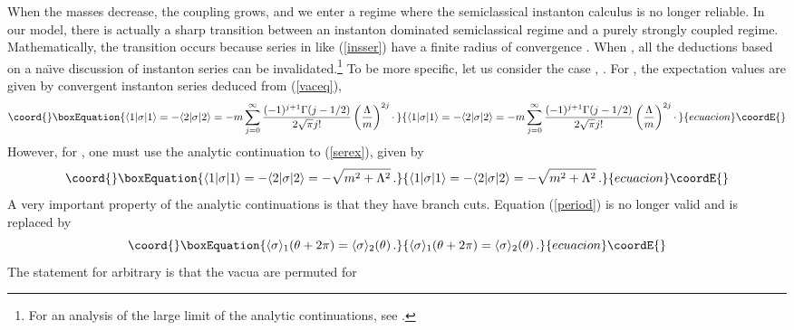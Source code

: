 \documentclass[a4paper,12pt]{article}
\begin{document}
When the masses \coordHE{} decrease, the coupling grows, and we 
enter a regime where the semiclassical instanton calculus 
is no longer reliable. In our model, there is actually a sharp 
transition between an instanton dominated semiclassical regime and 
a purely strongly coupled regime. Mathematically, the transition 
occurs because series in \coordHE{} like (\ref{insser}) have a finite
radius of convergence \coordHE{}. When \coordHE{},
all the deductions based on a na\"\i ve discussion of instanton series 
can be invalidated.\footnote{For an 
analysis of the large \coordHE{} limit of the analytic continuations, see 
\cite{fer1,fer2D}.} 
To be more specific, let us consider the case \coordHE{}, 
\coordHE{}.
For \coordHE{}, the expectation values are given by convergent
instanton series deduced from (\ref{vaceq}),
%
\begin{equation}\coord{}\boxEquation{
\label{serex}
\langle 1|\sigma |1\rangle = -\langle 2|\sigma |2\rangle = -m 
\sum_{j=0}^{\infty} {(-1)^{j+1}\Gamma(j-1/2)\over 2\sqrt{\pi} j!} 
\left( {\Lambda\over m}\right)^{2j}\cdotp
}{
\langle 1|\sigma |1\rangle = -\langle 2|\sigma |2\rangle = -m 
\sum_{j=0}^{\infty} {(-1)^{j+1}\Gamma(j-1/2)\over 2\sqrt{\pi} j!} 
\left( {\Lambda\over m}\right)^{2j}\cdotp
}{ecuacion}\coordE{}\end{equation}
%
However, for \coordHE{}, one must use the analytic continuation to 
(\ref{serex}), given by
%
\begin{equation}\coord{}\boxEquation{
\label{n1case}
\langle 1|\sigma |1\rangle = -\langle 2|\sigma |2\rangle = 
-\sqrt{m^{2}+\Lambda^{2}}\, .
}{
\langle 1|\sigma |1\rangle = -\langle 2|\sigma |2\rangle = 
-\sqrt{m^{2}+\Lambda^{2}}\, .
}{ecuacion}\coordE{}\end{equation}
%
A very important property of 
the analytic continuations is that they have branch cuts.
Equation (\ref{period}) is no longer valid and is replaced by
%
\begin{equation}\coord{}\boxEquation{
\label{periodfrac}
\langle\sigma\rangle_{1}(\theta + 2\pi) = 
\langle\sigma\rangle_{2}(\theta)\, .
}{
\langle\sigma\rangle_{1}(\theta + 2\pi) = 
\langle\sigma\rangle_{2}(\theta)\, .
}{ecuacion}\coordE{}\end{equation}
%
The statement for arbitrary \coordHE{} is that the vacua are permuted for 
\end{document}
